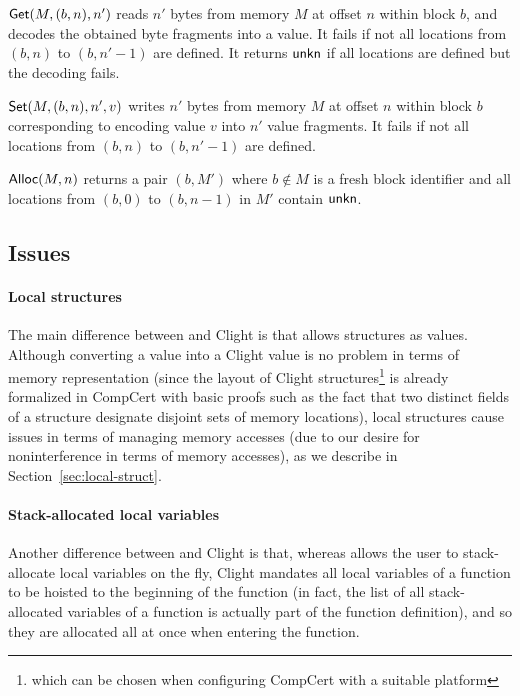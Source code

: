 $\text{\textsf{Get}}(M, (b, n), n')$ reads $n'$ bytes from memory $M$ at offset
$n$ within block $b$, and decodes the obtained byte fragments into a
value. It fails if not all locations from $(b, n)$ to $(b, n'-1)$ are
defined. It returns $\text{\textsf{unkn}}$ if all locations are defined but the
decoding fails.

$\text{\textsf{Set}}(M, (b, n), n', v)$ writes $n'$ bytes from memory $M$ at
offset $n$ within block $b$ corresponding to encoding value $v$ into
$n'$ value fragments. It fails if not all locations from $(b, n)$ to
$(b, n'-1)$ are defined.

$\text{\textsf{Alloc}}{}(M, n)$ returns a pair $(b, M')$ where $b \not\in M$ is a
fresh block identifier and all locations from $(b,0)$ to $(b,n-1)$ in
$M'$ contain $\text{\textsf{unkn}}$.

\subsection{Issues}

\paragraph{Local structures}

The main difference between \cstar and Clight is that \cstar allows structures
as values. Although converting a \cstar value into a Clight value is no
problem in terms of memory representation (since the layout of Clight
structures\footnote{which can be chosen when configuring CompCert with
  a suitable platform} is already formalized in CompCert with basic
proofs such as the fact that two distinct fields of a structure
designate disjoint sets of memory locations), local structures cause
issues in terms of managing memory accesses (due to our desire for
noninterference in terms of memory accesses), as we describe in
Section~\ref{sec:local-struct}.

\paragraph{Stack-allocated local variables}

Another difference between \cstar and Clight is that, whereas \cstar allows
the user to stack-allocate local variables on the fly, Clight mandates
all local variables of a function to be hoisted to the beginning of
the function (in fact, the list of all stack-allocated variables of a
function is actually part of the function definition), and so they are
allocated all at once when entering the function.

